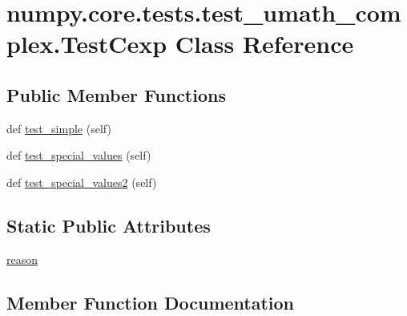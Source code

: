 \hypertarget{classnumpy_1_1core_1_1tests_1_1test__umath__complex_1_1TestCexp}{}\section{numpy.\+core.\+tests.\+test\+\_\+umath\+\_\+complex.\+Test\+Cexp Class Reference}
\label{classnumpy_1_1core_1_1tests_1_1test__umath__complex_1_1TestCexp}
\subsection*{Public Member Functions}
\begin{DoxyCompactItemize}
\item 
def \hyperlink{classnumpy_1_1core_1_1tests_1_1test__umath__complex_1_1TestCexp_a2f73b55f6f06eebea15326e361720c3a}{test\+\_\+simple} (self)
\item 
def \hyperlink{classnumpy_1_1core_1_1tests_1_1test__umath__complex_1_1TestCexp_aca85032ecf48fe41d5d43c058d97daba}{test\+\_\+special\+\_\+values} (self)
\item 
def \hyperlink{classnumpy_1_1core_1_1tests_1_1test__umath__complex_1_1TestCexp_ab44d80dc39a22855fe281f6c70508db8}{test\+\_\+special\+\_\+values2} (self)
\end{DoxyCompactItemize}
\subsection*{Static Public Attributes}
\begin{DoxyCompactItemize}
\item 
\hyperlink{classnumpy_1_1core_1_1tests_1_1test__umath__complex_1_1TestCexp_adeb6376f7928608e38b0eb59fd84ae50}{reason}
\end{DoxyCompactItemize}


\subsection{Member Function Documentation}
\mbox{\label{classnumpy_1_1core_1_1tests_1_1test__umath__complex_1_1TestCexp_a2f73b55f6f06eebea15326e361720c3a}} 
